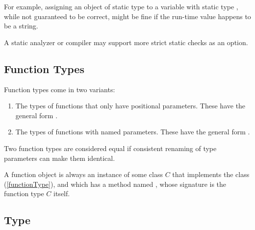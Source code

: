 \documentclass[makeidx]{article}
\begin{document}
{{For example, assigning an object of static type 
to a variable with static type ,
while not guaranteed to be correct,
might be fine if the run-time value happens to be a string.

A static analyzer or compiler
may support more strict static checks as an option.
}


\subsection{Function Types}

\LMHash{}%
Function types come in two variants:
\begin{enumerate}
\item
  The types of functions that only have positional parameters.
  These have the general form
  .
\item
  The types of functions with named parameters.
  These have the general form
  .
\end{enumerate}


\LMHash{}%
Two function types are considered equal if consistent renaming of type
parameters can make them identical.


\LMHash{}%
A function object is always an instance of some class $C$ that implements
the class \FUNCTION{} (\ref{functionType}),
and which has a method named \CALL{},
whose signature is the function type $C$ itself.


\subsection{Type \FUNCTION{}}

}
\end{document}
